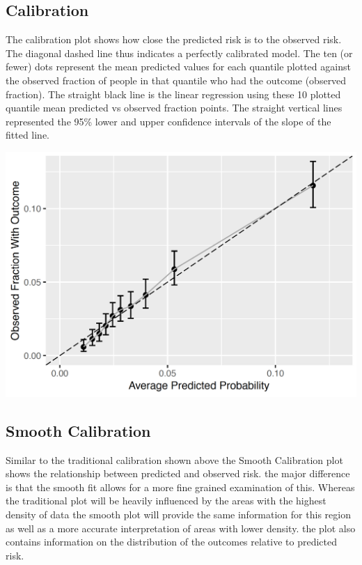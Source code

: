 \documentclass[]{book}
\begin{document}
\newpage

\subsection{Calibration}\label{calibration}

The calibration plot shows how close the predicted risk is to the
observed risk. The diagonal dashed line thus indicates a perfectly
calibrated model. The ten (or fewer) dots represent the mean predicted
values for each quantile plotted against the observed fraction of people
in that quantile who had the outcome (observed fraction). The straight
black line is the linear regression using these 10 plotted quantile mean
predicted vs observed fraction points. The straight vertical lines
represented the 95\% lower and upper confidence intervals of the slope
of the fitted line.

\includegraphics[width=1\linewidth]{images/PatientLevelPrediction/sparseCalibration}

\newpage

\subsection{Smooth Calibration}\label{smooth-calibration}

Similar to the traditional calibration shown above the Smooth
Calibration plot shows the relationship between predicted and observed
risk. the major difference is that the smooth fit allows for a more fine
grained examination of this. Whereas the traditional plot will be
heavily influenced by the areas with the highest density of data the
smooth plot will provide the same information for this region as well as
a more accurate interpretation of areas with lower density. the plot
also contains information on the distribution of the outcomes relative
to predicted risk.
\end{document}
